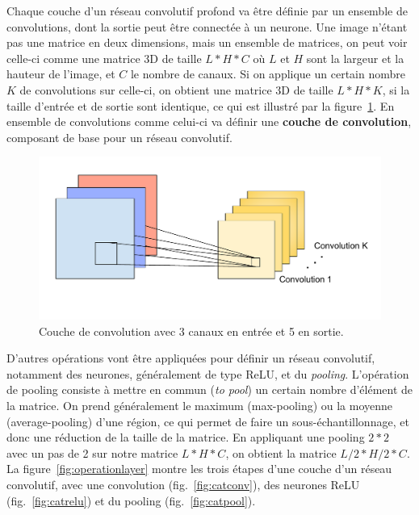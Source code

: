 Chaque couche d'un réseau convolutif profond va être définie par un ensemble de convolutions, dont la sortie peut être connectée à un neurone.
Une image n'étant pas une matrice en deux dimensions, mais un ensemble de matrices, on peut voir celle-ci comme une matrice 3D de taille $L*H*C$ où $L$ et $H$ sont la largeur et la hauteur de l'image, et $C$ le nombre de canaux.
Si on applique un certain nombre $K$ de convolutions sur celle-ci, on obtient une matrice 3D de taille $L*H*K$, si la taille d'entrée et de sortie sont identique, ce qui est illustré par la figure~\ref{fig:convMultiple}. 
En ensemble de convolutions comme celui-ci va définir une \textbf{couche de convolution}, composant de base pour un réseau convolutif.


\begin{figure}%
\includegraphics[width=\columnwidth]{figures/ConvolutionMultiple.pdf}%
\caption{Couche de convolution avec 3 canaux en entrée et 5 en sortie.}%
\label{fig:convMultiple}%
\end{figure}

D'autres opérations vont être appliquées pour définir un réseau convolutif, notamment des neurones, généralement de type ReLU, et du \textit{pooling}.
L'opération de pooling consiste à mettre en commun (\textit{to pool}) un certain nombre d'élément de la matrice. 
On prend généralement le maximum (max-pooling) ou la moyenne (average-pooling) d'une région, ce qui permet de faire un sous-échantillonnage, et donc une réduction de la taille de la matrice.
En appliquant une pooling $2*2$ avec un pas de 2 sur notre matrice $L*H*C$, on obtient la matrice $L/2 * H/2 * C$.
La figure~\ref{fig:operationlayer} montre les trois étapes d'une couche d'un réseau convolutif, avec une convolution (fig.~\ref{fig:catconv}), des neurones ReLU (fig.~\ref{fig:catrelu}) et du pooling (fig.~\ref{fig:catpool}).

